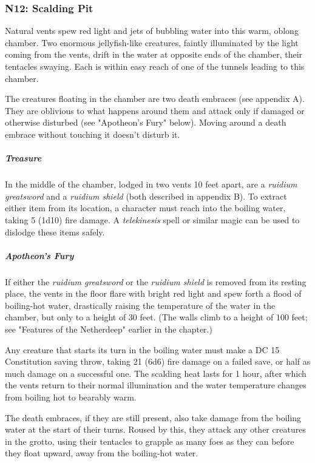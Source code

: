 \documentclass[10pt,a4paper,twoside,bg=print,twocolumn,openany,nodeprecatedcode]{dndbook}
\begin{document}
\subsubsection{N12: Scalding Pit}
\begin{DndReadAloud}{}
Natural vents spew red light and jets of bubbling water into this warm, oblong chamber. Two enormous jellyfish-like creatures, faintly illuminated by the light coming from the vents, drift in the water at opposite ends of the chamber, their tentacles swaying. Each is within easy reach of one of the tunnels leading to this chamber.

\end{DndReadAloud}

The creatures floating in the chamber are two death embraces (see appendix A). They are oblivious to what happens around them and attack only if damaged or otherwise disturbed (see "Apotheon's Fury" below). Moving around a death embrace without touching it doesn't disturb it.

\subparagraph{Treasure}
In the middle of the chamber, lodged in two vents 10 feet apart, are a \textit{ruidium greatsword} and a \textit{ruidium shield} (both described in appendix B). To extract either item from its location, a character must reach into the boiling water, taking 5 (1d10) fire damage. A \textit{telekinesis} spell or similar magic can be used to dislodge these items safely.

\subparagraph{Apotheon's Fury}
If either the \textit{ruidium greatsword} or the \textit{ruidium shield} is removed from its resting place, the vents in the floor flare with bright red light and spew forth a flood of boiling-hot water, drastically raising the temperature of the water in the chamber, but only to a height of 30 feet. (The walls climb to a height of 100 feet; see "Features of the Netherdeep" earlier in the chapter.)

Any creature that starts its turn in the boiling water must make a DC 15 Constitution saving throw, taking 21 (6d6) fire damage on a failed save, or half as much damage on a successful one. The scalding heat lasts for 1 hour, after which the vents return to their normal illumination and the water temperature changes from boiling hot to bearably warm.

The death embraces, if they are still present, also take damage from the boiling water at the start of their turns. Roused by this, they attack any other creatures in the grotto, using their tentacles to grapple as many foes as they can before they float upward, away from the boiling-hot water.
\end{document}
